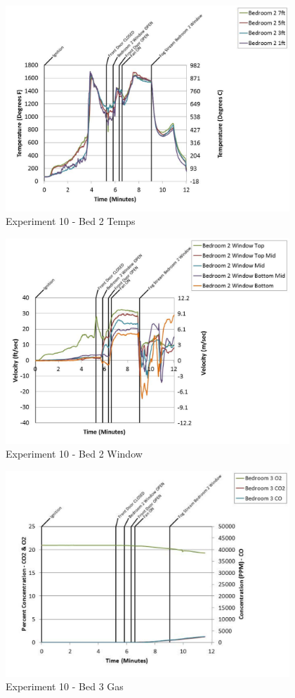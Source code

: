\documentclass{article}
\begin{document}
\begin{appendices}
	\clearpage

	\begin{figure}[h!]
		\centering
		\includegraphics[height=3.05in]{0_Images/Results_Charts/Exp_10_Charts/Bed2Temps.pdf}
		\caption{Experiment 10 - Bed 2 Temps}
	\end{figure}
 

	\begin{figure}[h!]
		\centering
		\includegraphics[height=3.05in]{0_Images/Results_Charts/Exp_10_Charts/Bed2Window.pdf}
		\caption{Experiment 10 - Bed 2 Window}
	\end{figure}
 
	\clearpage

	\begin{figure}[h!]
		\centering
		\includegraphics[height=3.05in]{0_Images/Results_Charts/Exp_10_Charts/Bed3Gas.pdf}
		\caption{Experiment 10 - Bed 3 Gas}
	\end{figure}
 


\end{appendices}
\end{document}
